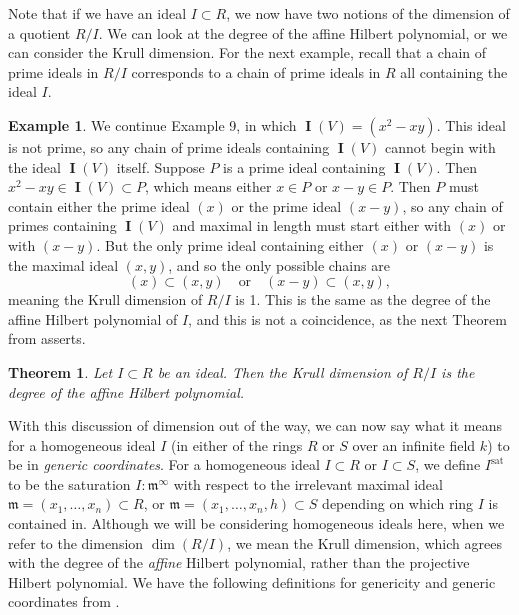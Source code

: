 \documentclass[11pt]{article}
\newcommand{\sat}{^{\text{sat}}}
\DeclareMathOperator{\I}{\mathbf{I}}
\newtheorem{theorem}{Theorem}
\theoremstyle{definition}
\newtheorem{example}{Example}
\begin{document}
Note that if we have an ideal $I \subset R$, we now have two notions of the dimension of a quotient $R/I$. We can look at the degree of the affine Hilbert polynomial, or we can consider the Krull dimension. For the next example, recall that a chain of prime ideals in $R/I$ corresponds to a chain of prime ideals in $R$ all containing the ideal $I$. 


\begin{example}
	We continue Example 9, in which $\I(V) = (x^2 - xy)$. This ideal is not prime, so any chain of prime ideals containing $\I(V)$ cannot begin with the ideal $\I(V)$ itself. Suppose $P$ is a prime ideal containing $\I(V)$. Then $x^2 - xy \in \I(V) \subset P$, which means either $x \in P$ or $x - y \in P$. Then $P$ must contain either the prime ideal $(x)$ or the prime ideal $(x - y)$, so any chain of primes containing $\I(V)$ and maximal in length must start either with $(x)$ or with $(x - y)$. But the only prime ideal containing either $(x)$ or $(x - y)$ is the maximal ideal $(x,y)$, and so the only possible chains are \[ (x) \subset (x,y) \quad \text{or} \quad (x - y) \subset (x,y), \] meaning the Krull dimension of $R/I$ is 1. This is the same as the degree of the affine Hilbert polynomial of $I$, and this is not a coincidence, as the next Theorem from \cite{kemper2011course} asserts. 
\end{example}


\begin{theorem}
	Let $I \subset R$ be an ideal. Then the Krull dimension of $R/I$ is the degree of the affine Hilbert polynomial. 
\end{theorem}


With this discussion of dimension out of the way, we can now say what it means for a homogeneous ideal $I$ (in either of the rings $R$ or $S$ over an infinite field $k$) to be in \emph{generic coordinates}. For a homogeneous ideal $I \subset R$ or $I \subset S$, we define $I\sat$ to be the saturation $I:\mathfrak{m}^\infty$ with respect to the irrelevant maximal ideal $\mathfrak{m} = (x_1, \dots, x_n) \subset R$, or $\mathfrak{m} = (x_1, \dots, x_n, h) \subset S$ depending on which ring $I$ is contained in. Although we will be considering homogeneous ideals here, when we refer to the dimension $\dim(R/I)$, we mean the Krull dimension, which agrees with the degree of the \emph{affine} Hilbert polynomial, rather than the projective Hilbert polynomial. We have the following definitions for genericity and generic coordinates from \cite{bayer1987criterion}. 
\end{document}
